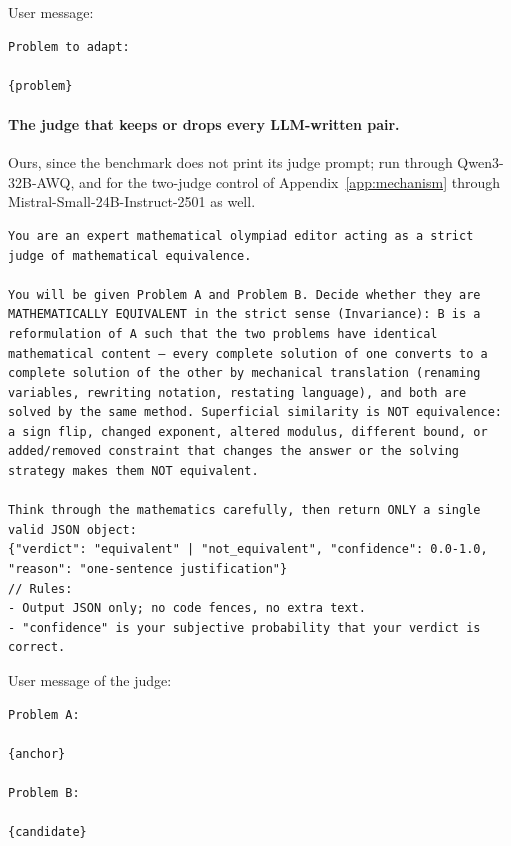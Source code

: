 User message:
\begin{Verbatim}[breaklines=true,breakanywhere=true,fontsize=\small]
Problem to adapt:

{problem}
\end{Verbatim}

\paragraph{The judge that keeps or drops every LLM-written pair.}
Ours, since the benchmark does not print its judge prompt; run through Qwen3-32B-AWQ, and for the two-judge control of Appendix~\ref{app:mechanism} through Mistral-Small-24B-Instruct-2501 as well.
\begin{Verbatim}[breaklines=true,breakanywhere=true,fontsize=\small]
You are an expert mathematical olympiad editor acting as a strict judge of mathematical equivalence.

You will be given Problem A and Problem B. Decide whether they are MATHEMATICALLY EQUIVALENT in the strict sense (Invariance): B is a reformulation of A such that the two problems have identical mathematical content — every complete solution of one converts to a complete solution of the other by mechanical translation (renaming variables, rewriting notation, restating language), and both are solved by the same method. Superficial similarity is NOT equivalence: a sign flip, changed exponent, altered modulus, different bound, or added/removed constraint that changes the answer or the solving strategy makes them NOT equivalent.

Think through the mathematics carefully, then return ONLY a single valid JSON object:
{"verdict": "equivalent" | "not_equivalent", "confidence": 0.0-1.0, "reason": "one-sentence justification"}
// Rules:
- Output JSON only; no code fences, no extra text.
- "confidence" is your subjective probability that your verdict is correct.
\end{Verbatim}

User message of the judge:
\begin{Verbatim}[breaklines=true,breakanywhere=true,fontsize=\small]
Problem A:

{anchor}

Problem B:

{candidate}
\end{Verbatim}

